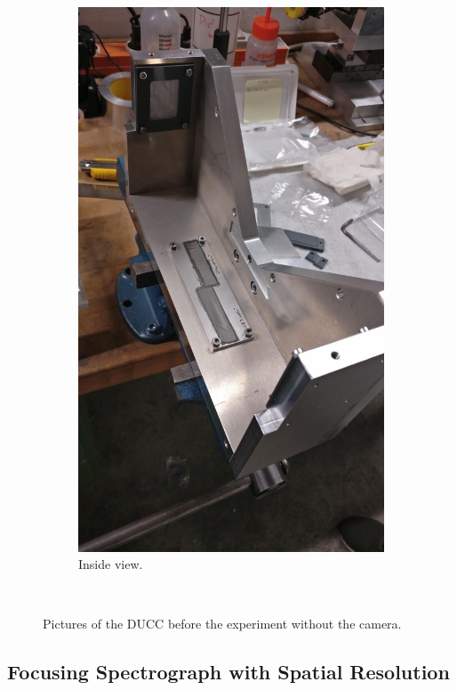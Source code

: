 \begin{figure} [H]
\begin{subfigure}[t]{0.45\textwidth}
		\includegraphics[width=\textwidth]{InventorPics/Real_pic_DUCC_inside.jpeg}
		\caption{Inside view.}
	\end{subfigure}\\[1ex]
	\caption{Pictures of the DUCC before the experiment without the camera.}
\end{figure}

\subsection{Focusing Spectrograph with Spatial Resolution}

